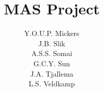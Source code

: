 \documentclass[whitelogo]{tudelft-report}
\begin{document}
\frontmatter

\title[tudelft-cyan]{MAS Project}
\author[tudelft-black]{Y.O.U.P. Mickers\\[1mm]J.B. Slik\\[1mm]A.S.S. Somai\\[1mm]G.C.Y. Sun\\[1mm]J.A. Tjallema\\[1mm]L.S. Veldkamp}
\titleoffsetx{3cm}
\titleoffsety{10cm}
\afiloffsetx{1cm}
\afiloffsety{18cm}






\tableofcontents

\mainmatter



\appendix

%


\end{document}
